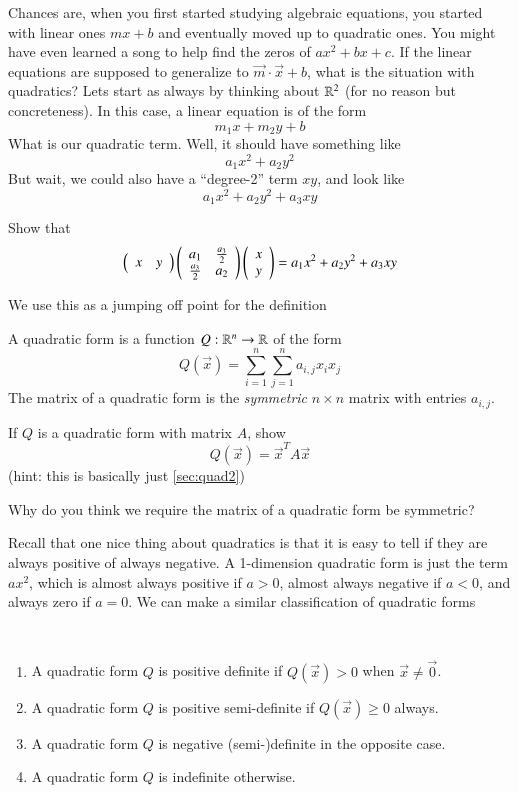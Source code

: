 \documentclass[Main.tex]{subfiles}
\begin{document}
Chances are, when you first started studying algebraic equations, you started with linear ones $mx+b$ and eventually moved up to quadratic ones.  
You might have even learned a song to help find the zeros of $ax^2+bx+c$.
If the linear equations are supposed to generalize to $\vec{m}\cdot\vec{x}+b$, what is the situation with quadratics?
Lets start as always by thinking about $\mathbb{R}^2$ (for no reason but concreteness).
In this case, a linear equation is of the form
\[m_1x + m_2y + b\]
What is our quadratic term.
Well, it should have something like
\[a_1x^2 + a_2y^2\]
But wait, we could also have a ``degree-2'' term $xy$, and look like
\[a_1x^2 + a_2y^2 + a_3xy\]
\begin{EasyEx}
  \label{sec:quad2}
  Show that
  \[\left(\begin{array}{cc} x & y \end{array}\right)\left(\begin{array}{cc} a_1 & \frac{a_3}{2} \\ \frac{a_3}{2} & a_2\end{array}\right)\left(\begin{array}{c}x\\y\end{array}\right) = a_1x^2 + a_2y^2 + a_3xy \]
\end{EasyEx}
We use this as a jumping off point for the definition
\begin{Def}
  A quadratic form is a function $Q:\mathbb{R}^n\to \mathbb{R}$ of the form
  \[Q(\vec{x}) = \sum_{i=1}^n \sum_{j=1}^n a_{i,j}x_ix_j\]
  The matrix of a quadratic form is the \emph{symmetric} $n\times n$ matrix with entries $a_{i,j}$.  
\end{Def}
\begin{EasyEx}
  If $Q$ is a quadratic form with matrix $A$, show
  \[Q(\vec{x})=\vec{x}^TA\vec{x}\]
  (hint: this is basically just \ref{sec:quad2})
\end{EasyEx}
\begin{Ex}
  Why do you think we require the matrix of a quadratic form be symmetric?
\end{Ex}
Recall that one nice thing about quadratics is that it is easy to tell if they are always positive of always negative.
A 1-dimension quadratic form is just the term $ax^2$, which is almost always positive if $a>0$, almost always negative if $a<0$, and always zero if $a=0$.
We can make a similar classification of quadratic forms
\begin{Def}\ \\
  \begin{enumerate}[]
    \item A quadratic form $Q$ is positive definite if $Q(\vec{x})>0$ when $\vec{x}\ne \vec{0}$.
    \item A quadratic form $Q$ is positive semi-definite if $Q(\vec{x})\ge 0$ always.
    \item A quadratic form $Q$ is negative (semi-)definite in the opposite case.
    \item A quadratic form $Q$ is indefinite otherwise.  
    \end{enumerate}
\end{Def}
\end{document}

